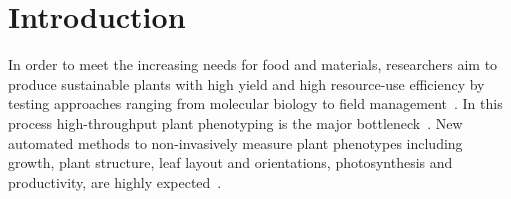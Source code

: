 \section{Introduction}
\label{sec:intro}

%


In order to meet the increasing needs for food and materials, researchers aim to produce sustainable plants with high yield and high resource-use efficiency by testing approaches ranging from molecular biology to field management~\cite{walter2015plant1}. In this process high-throughput plant phenotyping is the major bottleneck~\cite{cobb2013next}. New automated methods to non-invasively measure plant phenotypes including growth, plant structure, leaf layout and orientations, photosynthesis and productivity, are highly expected~\cite{leister1999large,muller2015leaf,walter2015plant1}. 


